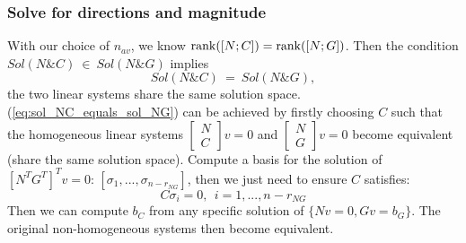 \subsubsection{Solve for directions and magnitude} %
\label{subsub:solve_for_directions_and_magnitude}
With our choice of $n_{av}$, we know ${\rm rank}([N; C])={\rm rank}([N; G])$. Then the condition $Sol(N\&C)\ \in\ Sol(N\&G)$ implies
\begin{equation}
\label{eq:sol_NC_equals_sol_NG}
  Sol(N\&C)\ =\ Sol(N\&G),
\end{equation}
\ie the two linear systems share the same solution space. (\ref{eq:sol_NC_equals_sol_NG}) can be achieved by firstly choosing $C$ such that the homogeneous linear systems $\left[ {\begin{array}{*{20}{c}}N\\C\end{array}} \right]v = 0$ and $\left[ {\begin{array}{*{20}{c}}N\\G\end{array}} \right]v = 0$
become equivalent (share the same solution space). Compute a basis for the solution of $[N^T G^T]^Tv=0$: $[\sigma_1,...,\sigma_{n-r_{NG} }]$, then we just need to ensure $C$ satisfies:
\begin{equation}
\label{eq:constraints_on_C}
  C\sigma_i=0,\ \  i=1,...,n-r_{NG}
\end{equation}
Then we can compute $b_C$ from any specific solution of $\{Nv=0, Gv=b_G\}$. The original non-homogeneous systems then become equivalent.

